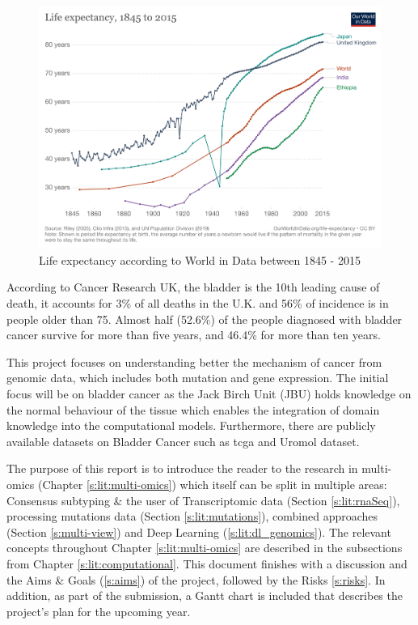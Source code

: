 \begin{figure}[!htb]
    \centering\includegraphics[width=1.0\textwidth,height=0.3\textheight,keepaspectratio]{Images/Resources/life-expectancy.png}
      \caption{Life expectancy according to World in Data between 1845 - 2015\cite{World_in_Data_undated-no}}
      \label{fig:life_expectancy}
  \end{figure}
  \FloatBarrier

According to Cancer Research UK\cite{Cancer_Research_UK2015-cf}, the bladder is the 10th leading cause of death, it accounts for 3\% of all deaths in the U.K. and 56\% of incidence is in people older than 75. Almost half (52.6\%) of the people diagnosed with bladder cancer survive for more than five years, and 46.4\% for more than ten years. 

This project focuses on understanding better the mechanism of cancer from genomic data, which includes both mutation and gene expression. The initial focus will be on bladder cancer as the Jack Birch Unit (JBU) holds knowledge on the normal behaviour of the tissue which enables the integration of domain knowledge into the computational models. Furthermore, there are publicly available datasets on Bladder Cancer such as \acrfull{tcga}\cite{Tcga2018-sj} and Uromol dataset\cite{Lindskrog2021-ov, The_European_Genome-phenome_Archive_undated-pz}.

The purpose of this report is to introduce the reader to the research in multi-omics (Chapter \ref{s:lit:multi-omics}) which itself can be split in multiple areas: Consensus subtyping \& the user of Transcriptomic data (Section \ref{s:lit:rnaSeq}), processing mutations data (Section \ref{s:lit:mutations}), combined approaches (Section \ref{s:multi-view}) and Deep Learning (\ref{s:lit:dl_genomics}). The relevant concepts throughout  Chapter \ref{s:lit:multi-omics} are described in the subsections from Chapter \ref{s:lit:computational}. This document finishes with a discussion and the Aims \& Goals (\ref{s:aims}) of the project, followed by the Risks \ref{s:risks}. In addition, as part of the submission, a Gantt chart is included that describes the project's plan for the upcoming year. 

